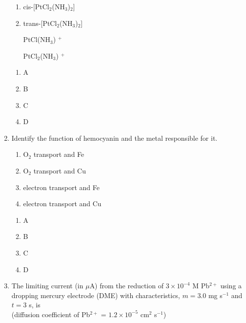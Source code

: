 \documentclass[journal,12pt,onecolumn]{exam}
\theoremstyle{remark}
\newcommand{\correct}{\textcolor{correctgreen}{\checkmark}}
\newcommand{\wrong}{\textcolor{wrongred}{\ding{55}}} %
\begin{document}
\begin{enumerate}
\begin{enumerate}
    \item cis-[PtCl$_2$(NH$_3$)$_2$]
    \item trans-[PtCl$_2$(NH$_3$)$_2$]
    \item [PtCl(NH$_3$)]$^+$
    \item [PtCl$_2$(NH$_3$)]$^+$
\end{enumerate}

\hfill{}

\begin{multicols}{2}
\begin{enumerate}[leftmargin=*, align=left]
    \item \correct A
    \item \wrong B
    \item \wrong C
    \item \wrong D
\end{enumerate}
\end{multicols}


\item 
Identify the function of hemocyanin and the metal responsible for it.

\begin{enumerate}
    \item O$_2$ transport and Fe
    \item O$_2$ transport and Cu
    \item electron transport and Fe
    \item electron transport and Cu
\end{enumerate}

\hfill{}

\begin{multicols}{2}
\begin{enumerate}[leftmargin=*, align=left]
    \item \wrong A
    \item \correct B
    \item \wrong C
    \item \wrong D
\end{enumerate}
\end{multicols}


\item 
The limiting current (in $\mu$A) from the reduction of $3 \times 10^{-4}$ M Pb$^{2+}$ using a dropping mercury electrode (DME) with characteristics, $m = 3.0$ mg s$^{-1}$ and $t = 3$ s, is \\
(diffusion coefficient of Pb$^{2+}$ = $1.2 \times 10^{-5}$ cm$^2$ s$^{-1}$)


\end{enumerate}
\end{document}
